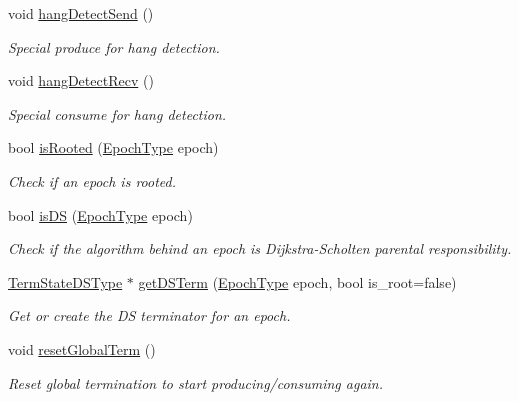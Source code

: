 \begin{DoxyCompactItemize}
void \hyperlink{structvt_1_1term_1_1_termination_detector_ad863add6716d920778eef1298016a0ea}{hang\+Detect\+Send} ()
\begin{DoxyCompactList}\small\item\em Special produce for hang detection. \end{DoxyCompactList}\item 
void \hyperlink{structvt_1_1term_1_1_termination_detector_ad9b79c662481216d0bb70f81b12dfbf8}{hang\+Detect\+Recv} ()
\begin{DoxyCompactList}\small\item\em Special consume for hang detection. \end{DoxyCompactList}\item 
bool \hyperlink{structvt_1_1term_1_1_termination_detector_ad95b226357b77e29c415627bbca4e798}{is\+Rooted} (\hyperlink{namespacevt_a985a5adf291c34a3ca263b3378388236}{Epoch\+Type} epoch)
\begin{DoxyCompactList}\small\item\em Check if an epoch is rooted. \end{DoxyCompactList}\item 
bool \hyperlink{structvt_1_1term_1_1_termination_detector_a3ab6ba4618093384b6ddd6c0607df543}{is\+DS} (\hyperlink{namespacevt_a985a5adf291c34a3ca263b3378388236}{Epoch\+Type} epoch)
\begin{DoxyCompactList}\small\item\em Check if the algorithm behind an epoch is Dijkstra-\/\+Scholten parental responsibility. \end{DoxyCompactList}\item 
\hyperlink{structvt_1_1term_1_1_termination_detector_aa96c37b5c120063060c6418c48e64bd1}{Term\+State\+D\+S\+Type} $\ast$ \hyperlink{structvt_1_1term_1_1_termination_detector_a546a48949da827a98dea2cfaffeddb91}{get\+D\+S\+Term} (\hyperlink{namespacevt_a985a5adf291c34a3ca263b3378388236}{Epoch\+Type} epoch, bool is\+\_\+root=false)
\begin{DoxyCompactList}\small\item\em Get or create the DS terminator for an epoch. \end{DoxyCompactList}\item 
void \hyperlink{structvt_1_1term_1_1_termination_detector_a756e767b99e869966247c9198403afb6}{reset\+Global\+Term} ()
\begin{DoxyCompactList}\small\item\em Reset global termination to start producing/consuming again. \end{DoxyCompactList}\item 

\end{DoxyCompactItemize}
